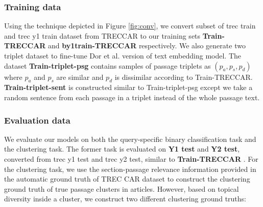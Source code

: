 
\subsubsection{Training data} Using the technique depicted in Figure \ref{fig:conv}, we convert subset of trec train and trec y1 train dataset from TRECCAR to our training sets \textbf{Train-TRECCAR} and \textbf{by1train-TRECCAR} respectively. We also generate two  triplet dataset to fine-tune  Dor et al. version of text embedding model. The dataset \textbf{Train-triplet-psg} contains samples of passage triplets as $(p_a, p_s, p_d)$ where $p_a$ and $p_s$ are similar and $p_d$ is dissimilar according to Train-TRECCAR. \textbf{Train-triplet-sent} is constructed similar to Train-triplet-psg except we take a random sentence from each passage in a triplet instead of the whole passage text. 

\subsubsection{Evaluation data} We evaluate our models on both the query-specific binary classification task and the clustering task. The former task is evaluated on \textbf{Y1 test} and \textbf{Y2 test}, converted from trec y1 test and trec y2 test, similar to \textbf{Train-TRECCAR} . For the clustering task, we use the section-passage relevance information provided in the automatic ground truth of TREC CAR dataset to construct the clustering ground truth of true passage clusters in articles. However, based on topical diversity inside a cluster, we construct two different clustering ground truths:

